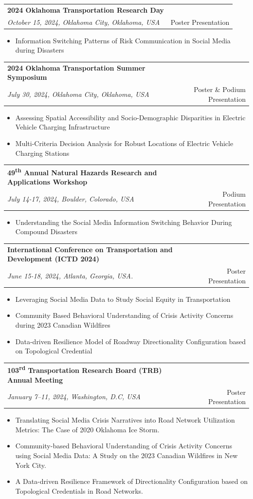 \documentclass[a4paper,11pt]{article}
\makeatletter
\newcommand{\resumeProject}[4]{
\vspace{0.5mm}\item
    \begin{tabular*}{0.98\textwidth}[t]{l@{\extracolsep{\fill}}r}
        \textbf{#1} & \textit{\footnotesize{#3}} \\
        \footnotesize{\textit{#2}} & \footnotesize{#4}
    \end{tabular*}
    \vspace{-2.4mm}
}
\newcommand{\resumeItemListStart}{\begin{itemize}[leftmargin=*,labelsep=1mm,itemsep=0.5mm]}
\newcommand{\resumeItemListEnd}{\end{itemize}\vspace{-2mm}}
\makeatother
\begin{document}
\resumeProject
  {\textcolor{mycolor}{2024 Oklahoma Transportation Research Day}}
  {October 15, 2024, Oklahoma City, Oklahoma, USA}{}{{Poster Presentation}}
\resumeItemListStart
    \item Information Switching Patterns of Risk Communication in Social Media during Disasters
\resumeItemListEnd


\resumeProject
  {\textcolor{mycolor}{2024 Oklahoma Transportation Summer Symposium}}
  {July 30, 2024, Oklahoma City, Oklahoma, USA}{}{{Poster \& Podium Presentation}}
\resumeItemListStart
    \item Assessing Spatial Accessibility and Socio-Demographic Disparities in Electric Vehicle Charging Infrastructure
    \item Multi-Criteria Decision Analysis for Robust Locations of Electric Vehicle Charging Stations
\resumeItemListEnd


\resumeProject
  {\textcolor{mycolor}{49\textsuperscript{th} Annual Natural Hazards Research and Applications Workshop}}
  {July 14-17, 2024, Boulder, Colorado, USA}{}{{Podium Presentation}}
\resumeItemListStart
  \item Understanding the Social Media Information Switching Behavior During Compound Disasters
\resumeItemListEnd


\resumeProject
  {\textcolor{mycolor}{International Conference on Transportation and Development (ICTD 2024)}}
  {June 15-18, 2024, Atlanta, Georgia, USA.}{}{{Poster Presentation}}
\resumeItemListStart
    \item Leveraging Social Media Data to Study Social Equity in Transportation
    \item Community Based Behavioral Understanding of Crisis Activity Concerns during 2023 Canadian Wildfires
    \item Data-driven Resilience Model of Roadway Directionality Configuration based on Topological Credential
\resumeItemListEnd


\resumeProject
  {\textcolor{mycolor}{103\textsuperscript{rd} Transportation Research Board (TRB) Annual Meeting}}
  {January 7–11, 2024, Washington, D.C, USA}{}{{Poster Presentation}}
\resumeItemListStart
    \item Translating Social Media Crisis Narratives into Road Network Utilization Metrics: The Case of 2020 Oklahoma Ice Storm.
    \item Community-based Behavioral Understanding of Crisis Activity Concerns using Social Media Data: A Study on the 2023 Canadian Wildfires in New York City.
    \item A Data-driven Resilience Framework of Directionality Configuration based on Topological Credentials in Road Networks.
\resumeItemListEnd
\end{document}
